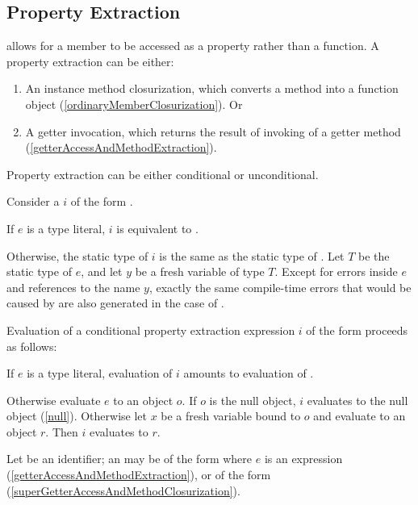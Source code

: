\documentclass[makeidx]{article}
\begin{document}
{\subsection{Property Extraction}

\LMHash{}%
allows for a member to be accessed as a property rather than a function.
A property extraction can be either:
\begin{enumerate}
\item An instance method closurization,
  which converts a method into a function object
  (\ref{ordinaryMemberClosurization}).
  Or
\item A getter invocation, which returns
  the result of invoking of a getter method
  (\ref{getterAccessAndMethodExtraction}).
\end{enumerate}


Property extraction can be either conditional or unconditional.

\LMHash{}%
Consider a 
$i$ of the form .

\LMHash{}%
If $e$ is a type literal, $i$ is equivalent to .

\LMHash{}%
Otherwise, the static type of $i$ is the same as
the static type of .
Let $T$ be the static type of $e$,
and let $y$ be a fresh variable of type $T$.
Except for errors inside $e$ and references to the name $y$,
exactly the same compile-time errors that would be caused by 
are also generated in the case of .

\LMHash{}%
Evaluation of a conditional property extraction expression $i$
of the form  proceeds as follows:

\LMHash{}%
If $e$ is a type literal,
evaluation of $i$ amounts to evaluation of .

\LMHash{}%
Otherwise evaluate $e$ to an object $o$.
If $o$ is the null object, $i$ evaluates to the null object (\ref{null}).
Otherwise let $x$ be a fresh variable bound to $o$
and evaluate  to an object $r$.
Then $i$ evaluates to $r$.
\EndCase

\LMHash{}%
Let \id{} be an identifier;
an 
may be of the form  where $e$ is an expression
(\ref{getterAccessAndMethodExtraction}),
or of the form 
(\ref{superGetterAccessAndMethodClosurization}).
\EndCase


}
\end{document}
